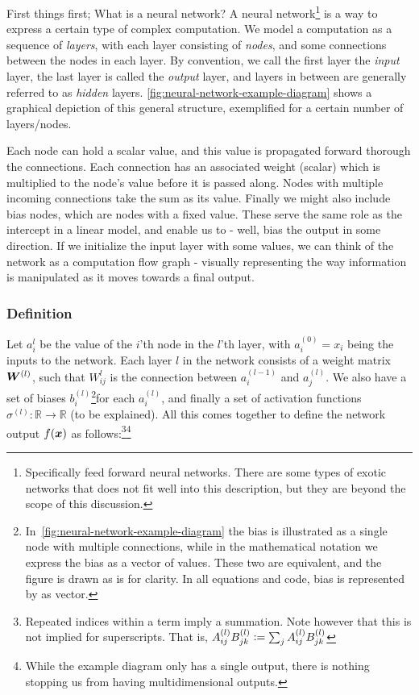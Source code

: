 \documentclass[Thesis.tex]{subfiles}
\begin{document}
First things first; What is a neural network? A neural
network\footnote{Specifically feed forward neural networks. There are some types
of exotic networks that does not fit well into this description, but they are
beyond the scope of this discussion.} is a way to express a certain type of
complex computation. We model a computation as a sequence of \emph{layers}, with
each layer consisting of \emph{nodes}, and some connections between the nodes in
each layer. By convention, we call the first layer the \emph{input} layer, the
last layer is called the \emph{output} layer, and layers in between are
generally referred to as \emph{hidden} layers.
\cref{fig:neural-network-example-diagram} shows a graphical depiction of this
general structure, exemplified for a certain number of layers/nodes.

Each node can hold a scalar value, and this value is propagated forward thorough
the connections. Each connection has an associated weight (scalar) which is
multiplied to the node's value before it is passed along. Nodes with multiple
incoming connections take the sum as its value. Finally we might also include
bias nodes, which are nodes with a fixed value. These serve the same role as the
intercept in a linear model, and enable us to - well, bias the output in some
direction. If we initialize the input layer with some values, we can think of
the network as a computation flow graph - visually representing the way
information is manipulated as it moves towards a final output.

\subsubsection{Definition}

 Let $a_i^{l}$ be the value of the $i$'th node in the $l$'th layer, with
$a_i^{(0)}=x_i$ being the inputs to the network. Each layer $l$ in the network
consists of a weight matrix $\bm{W}^{(l)}$, such that $W_{ij}^{l}$ is the
connection between $a_i^{(l-1)}$ and $a_j^{(l)}$. We also have a set of biases
$b_i^{(l)}$\footnote{In~\cref{fig:neural-network-example-diagram} the bias is
illustrated as a single node with multiple connections, while in the
mathematical notation we express the bias as a vector of values. These two are
equivalent, and the figure is drawn as is for clarity. In all equations and
code, bias is represented by as vector.}for each $a_i^{(l)}$, and finally a set
of activation functions $\sigma^{(l)}: \mathbb{R}\to\mathbb{R}$ (to be
explained). All this comes together to define the network output $f(\bm{x})$ as
follows:\footnote{Repeated indices within a term imply a summation. Note however
that this is not implied for superscripts. That is, $A_{ij}^{(l)}B_{jk}^{(l)}
\vcentcolon= \sum_{j} A_{ij}^{(l)}B_{jk}^{(l)}$}\footnote{While the example diagram
only has a single output, there is nothing stopping us from having
multidimensional outputs.}
\end{document}
